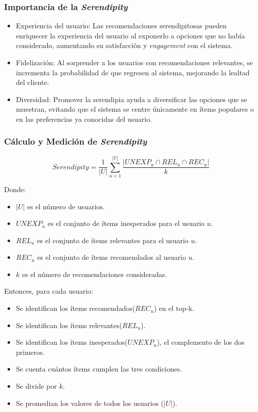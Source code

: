 \documentclass[11pt,a4paper,twoside]{thesis}
\begin{document}
\subsubsection*{Importancia de la \textit{Serendipity}}

\begin{itemize}
	\item Experiencia del usuario: Las recomendaciones serendipitosas pueden enriquecer la experiencia del usuario al exponerlo a opciones que no había considerado, aumentando su satisfacción y \textit{engagement} con el sistema.
	\item Fidelización: Al sorprender a los usuarios con recomendaciones relevantes, se incrementa la probabilidad de que regresen al sistema, mejorando la lealtad del cliente.
	\item Diversidad: Promover la serendipia ayuda a diversificar las opciones que se muestran, evitando que el sistema se centre únicamente en ítems populares o en las preferencias ya conocidas del usuario.
\end{itemize}

\subsubsection*{Cálculo y Medición de \textit{Serendipity}}

\begin{equation}
	Serendipity = \frac{1}{|U|} \sum_{u=1}^{|U|} \frac{|UNEXP_u \cap REL_u \cap REC_u|}{k}
\end{equation}

Donde:
\begin{itemize}
	\item $|U|$ es el número de usuarios.
	\item $UNEXP_u$ es el conjunto de ítems inesperados para el usuario $u$.
	\item $REL_u$ es el conjunto de ítems relevantes para el usuario $u$.
	\item $REC_u$ es el conjunto de ítems recomendados al usuario $u$.
	\item $k$ es el número de recomendaciones consideradas.
\end{itemize}


Entonces, para cada usuario:

\begin{itemize}
	\item Se identifican los ítems recomendados($REC_u$) en el top-k.
	\item Se identifican los ítems relevantes($REL_u$).
	\item Se identifican los ítems inesperados($UNEXP_u$), el complemento de los dos primeros.
	\item Se cuenta cuántos ítems cumplen las tres condiciones.
	\item Se divide por $k$.
	\item Se promedian los valores de todos los usuarios ($|U|$).
\end{itemize}
\end{document}

